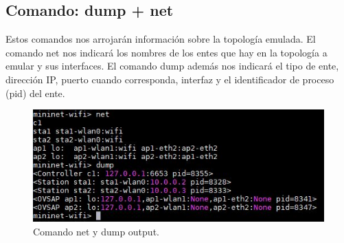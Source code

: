 \subsection{Comando: dump + net}
Estos comandos nos arrojarán información sobre la topología emulada. El comando net nos indicará los nombres de los entes que hay en la topología a emular y sus interfaces. El comando dump además nos indicará el tipo de ente, dirección IP, puerto cuando corresponda, interfaz y el identificador de proceso (pid) del ente.

 \begin{figure}[!htb]
  \centering
    \includegraphics[width=0.8\linewidth]{./img/cli/2.JPG}
    \caption{Comando net y dump output.}
  \label{fig:yo}
\end{figure}
